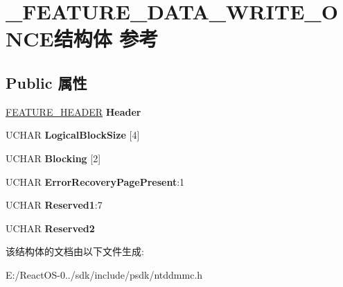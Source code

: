 \hypertarget{struct___f_e_a_t_u_r_e___d_a_t_a___w_r_i_t_e___o_n_c_e}{}\section{\+\_\+\+F\+E\+A\+T\+U\+R\+E\+\_\+\+D\+A\+T\+A\+\_\+\+W\+R\+I\+T\+E\+\_\+\+O\+N\+C\+E结构体 参考}
\label{struct___f_e_a_t_u_r_e___d_a_t_a___w_r_i_t_e___o_n_c_e}
\subsection*{Public 属性}
\begin{DoxyCompactItemize}
\item 
\mbox{\label{struct___f_e_a_t_u_r_e___d_a_t_a___w_r_i_t_e___o_n_c_e_a7659cac8b50a9cdd47e9f65a4bf9e2e0}} 
\hyperlink{struct___f_e_a_t_u_r_e___h_e_a_d_e_r}{F\+E\+A\+T\+U\+R\+E\+\_\+\+H\+E\+A\+D\+ER} {\bfseries Header}
\item 
\mbox{\label{struct___f_e_a_t_u_r_e___d_a_t_a___w_r_i_t_e___o_n_c_e_a6dcac48b361381018c097cebccb077a5}} 
U\+C\+H\+AR {\bfseries Logical\+Block\+Size} \mbox{[}4\mbox{]}
\item 
\mbox{\label{struct___f_e_a_t_u_r_e___d_a_t_a___w_r_i_t_e___o_n_c_e_a15c590114a2759af932af48d0c238774}} 
U\+C\+H\+AR {\bfseries Blocking} \mbox{[}2\mbox{]}
\item 
\mbox{\label{struct___f_e_a_t_u_r_e___d_a_t_a___w_r_i_t_e___o_n_c_e_ae3f58bba996b9c73db1f1bfd4f074720}} 
U\+C\+H\+AR {\bfseries Error\+Recovery\+Page\+Present}\+:1
\item 
\mbox{\label{struct___f_e_a_t_u_r_e___d_a_t_a___w_r_i_t_e___o_n_c_e_af123b118ca30a2a171203953dc6b871d}} 
U\+C\+H\+AR {\bfseries Reserved1}\+:7
\item 
\mbox{\label{struct___f_e_a_t_u_r_e___d_a_t_a___w_r_i_t_e___o_n_c_e_af7ce170ce6bc231643f2026bcb789dee}} 
U\+C\+H\+AR {\bfseries Reserved2}
\end{DoxyCompactItemize}


该结构体的文档由以下文件生成\+:\begin{DoxyCompactItemize}
\item 
E\+:/\+React\+O\+S-\/0../sdk/include/psdk/ntddmmc.\+h\end{DoxyCompactItemize}

